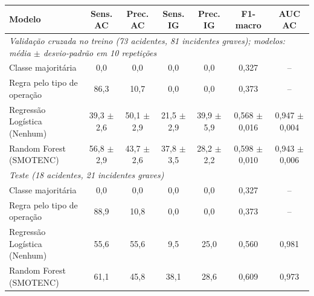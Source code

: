 \begin{tabular}{lcccccc}
\toprule
\textbf{Modelo} & \textbf{Sens. AC} & \textbf{Prec. AC} & \textbf{Sens. IG} & \textbf{Prec. IG} & \textbf{F1-macro} & \textbf{AUC AC} \\
\midrule
\multicolumn{7}{l}{\textit{Validação cruzada no treino (73 acidentes, 81 incidentes graves); modelos: média $\pm$ desvio-padrão em 10 repetições}} \\
Classe majoritária & 0,0 & 0,0 & 0,0 & 0,0 & 0,327 & -- \\
Regra pelo tipo de operação & 86,3 & 10,7 & 0,0 & 0,0 & 0,373 & -- \\
Regressão Logística (Nenhum) & 39,3 $\pm$ 2,6 & 50,1 $\pm$ 2,9 & 21,5 $\pm$ 2,9 & 39,9 $\pm$ 5,9 & 0,568 $\pm$ 0,016 & 0,947 $\pm$ 0,004 \\
Random Forest (SMOTENC) & 56,8 $\pm$ 2,9 & 43,7 $\pm$ 2,6 & 37,8 $\pm$ 3,5 & 28,2 $\pm$ 2,2 & 0,598 $\pm$ 0,010 & 0,943 $\pm$ 0,006 \\
\midrule
\multicolumn{7}{l}{\textit{Teste (18 acidentes, 21 incidentes graves)}} \\
Classe majoritária & 0,0 & 0,0 & 0,0 & 0,0 & 0,327 & -- \\
Regra pelo tipo de operação & 88,9 & 10,8 & 0,0 & 0,0 & 0,373 & -- \\
Regressão Logística (Nenhum) & 55,6 & 55,6 & 9,5 & 25,0 & 0,560 & 0,981 \\
Random Forest (SMOTENC) & 61,1 & 45,8 & 38,1 & 28,6 & 0,609 & 0,973 \\
\bottomrule
\end{tabular}
